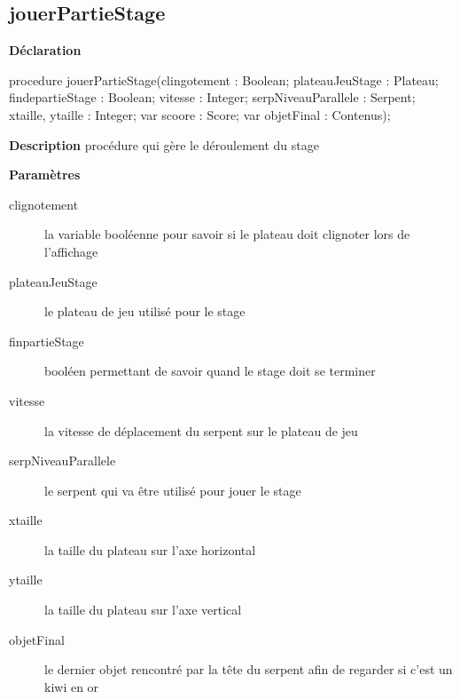 \documentclass{report}
\newif\ifpdf
\begin{document}
\subsection*{jouerPartieStage}
\fi
\label{Stage-jouerPartieStage}
\begin{list}{}{
\setlength{\itemindent}{0cm}
\setlength{\listparindent}{0cm}
\setlength{\leftmargin}{\evensidemargin}
\addtolength{\leftmargin}{\tmplength}
\settowidth{\labelsep}{X}
\addtolength{\leftmargin}{\labelsep}
\setlength{\labelwidth}{\tmplength}
}
\item[\textbf{Déclaration}\hfill]
\ifpdf
\begin{flushleft}
\fi
\begin{ttfamily}
procedure jouerPartieStage(clingotement : Boolean; plateauJeuStage : Plateau; findepartieStage : Boolean; vitesse : Integer; serpNiveauParallele : Serpent; xtaille, ytaille : Integer; var scoore : Score; var objetFinal : Contenus);\end{ttfamily}

\ifpdf
\end{flushleft}
\fi

\par
\item[\textbf{Description}]
procédure qui gère le déroulement du stage        \par
\item[\textbf{Paramètres}]
\begin{description}
\item[clignotement] la variable booléenne pour savoir si le plateau doit clignoter lors de l'affichage
\item[plateauJeuStage] le plateau de jeu utilisé pour le stage
\item[finpartieStage] booléen permettant de savoir quand le stage doit se terminer
\item[vitesse] la vitesse de déplacement du serpent sur le plateau de jeu
\item[serpNiveauParallele] le serpent qui va être utilisé pour jouer le stage
\item[xtaille] la taille du plateau sur l'axe horizontal
\item[ytaille] la taille du plateau sur l'axe vertical
\item[objetFinal] le dernier objet rencontré par la tête du serpent afin de regarder si c'est un kiwi en or
\end{description}


\end{list}
\ifpdf
\end{document}
